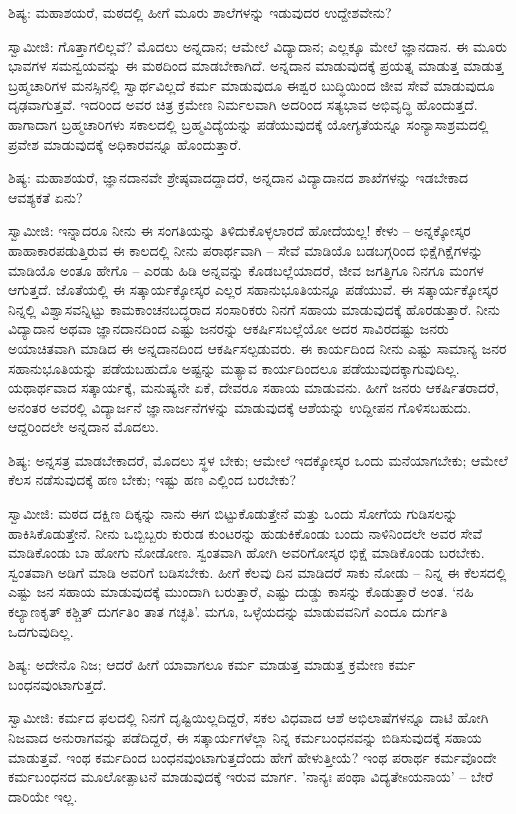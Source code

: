 ಶಿಷ್ಯ: ಮಹಾಶಯರೆ, ಮಠದಲ್ಲಿ ಹೀಗೆ ಮೂರು ಶಾಲೆಗಳನ್ನು ಇಡುವುದರ ಉದ್ದೇಶವೇನು?

ಸ್ವಾಮೀಜಿ: ಗೊತ್ತಾಗಲಿಲ್ಲವೆ? ಮೊದಲು ಅನ್ನದಾನ; ಆಮೇಲೆ ವಿದ್ಯಾದಾನ; ಎಲ್ಲಕ್ಕೂ ಮೇಲೆ ಜ್ಞಾನದಾನ. ಈ ಮೂರು ಭಾವಗಳ ಸಮನ್ವಯವನ್ನು ಈ ಮಠದಿಂದ ಮಾಡಬೇಕಾಗಿದೆ. ಅನ್ನದಾನ ಮಾಡುವುದಕ್ಕೆ ಪ್ರಯತ್ನ ಮಾಡುತ್ತ ಮಾಡುತ್ತ ಬ್ರಹ್ಮಚಾರಿಗಳ ಮನಸ್ಸಿನಲ್ಲಿ ಸ್ವಾರ್ಥವಿಲ್ಲದೆ ಕರ್ಮ ಮಾಡುವುದೂ ಈಶ್ವರ ಬುದ್ಧಿಯಿಂದ ಜೀವ ಸೇವೆ ಮಾಡುವುದೂ ದೃಢವಾಗುತ್ತವೆ. ಇದರಿಂದ ಅವರ ಚಿತ್ರ ಕ್ರಮೇಣ ನಿರ್ಮಲವಾಗಿ ಅದರಿಂದ ಸತ್ಯಭಾವ ಅಭಿವೃದ್ಧಿ ಹೊಂದುತ್ತದೆ. ಹಾಗಾದಾಗ ಬ್ರಹ್ಮಚಾರಿಗಳು ಸಕಾಲದಲ್ಲಿ ಬ್ರಹ್ಮವಿದ್ಯೆಯನ್ನು ಪಡೆಯುವುದಕ್ಕೆ ಯೋಗ್ಯತೆಯನ್ನೂ ಸಂನ್ಯಾಸಾಶ್ರಮದಲ್ಲಿ ಪ್ರವೇಶ ಮಾಡುವುದಕ್ಕೆ ಅಧಿಕಾರವನ್ನೂ ಹೊಂದುತ್ತಾರೆ.

ಶಿಷ್ಯ: ಮಹಾಶಯರೆ, ಜ್ಞಾನದಾನವೇ ಶ್ರೇಷ್ಠವಾದದ್ದಾದರೆ, ಅನ್ನದಾನ ವಿದ್ಯಾದಾನದ ಶಾಖೆಗಳನ್ನು ಇಡಬೇಕಾದ ಆವಶ್ಯಕತೆ ಏನು?

ಸ್ವಾಮೀಜಿ: ಇನ್ನಾದರೂ ನೀನು ಈ ಸಂಗತಿಯನ್ನು ತಿಳಿದುಕೊಳ್ಳಲಾರದೆ ಹೋದೆಯಲ್ಲ! ಕೇಳು – ಅನ್ನಕ್ಕೋಸ್ಕರ ಹಾಹಾಕಾರಪಡುತ್ತಿರುವ ಈ ಕಾಲದಲ್ಲಿ ನೀನು ಪರಾರ್ಥವಾಗಿ – ಸೇವೆ ಮಾಡಿಯೊ ಬಡಬಗ್ಗರಿಂದ ಭಿಕ್ಷೆಗಿಕ್ಷೆಗಳನ್ನು ಮಾಡಿಯೊ ಅಂತೂ ಹೇಗೊ – ಎರಡು ಹಿಡಿ ಅನ್ನವನ್ನು ಕೊಡಬಲ್ಲೆಯಾದರೆ, ಜೀವ ಜಗತ್ತಿಗೂ ನಿನಗೂ ಮಂಗಳ ಆಗುತ್ತದೆ. ಜೊತೆಯಲ್ಲಿ ಈ ಸತ್ಕಾರ್ಯಕ್ಕೋಸ್ಕರ ಎಲ್ಲರ ಸಹಾನುಭೂತಿಯನ್ನೂ ಪಡೆಯುವೆ. ಈ ಸತ್ಕಾರ್ಯಕ್ಕೋಸ್ಕರ ನಿನ್ನಲ್ಲಿ ವಿಶ್ವಾಸವನ್ನಿಟ್ಟು ಕಾಮಕಾಂಚನಬದ್ಧರಾದ ಸಂಸಾರಿಕರು ನಿನಗೆ ಸಹಾಯ ಮಾಡುವುದಕ್ಕೆ ಹೊರಡುತ್ತಾರೆ. ನೀನು ವಿದ್ಯಾದಾನ ಅಥವಾ ಜ್ಞಾನದಾನದಿಂದ ಎಷ್ಟು ಜನರನ್ನು ಆಕರ್ಷಿಸಬಲ್ಲೆಯೋ ಅದರ ಸಾವಿರದಷ್ಟು ಜನರು ಅಯಾಚಿತವಾಗಿ ಮಾಡಿದ ಈ ಅನ್ನದಾನದಿಂದ ಆಕರ್ಷಿಸಲ್ಪಡುವರು. ಈ ಕಾರ್ಯದಿಂದ ನೀನು ಎಷ್ಟು ಸಾಮಾನ್ಯ ಜನರ ಸಹಾನುಭೂತಿಯನ್ನು ಪಡೆಯಬಹುದೊ ಅಷ್ಟನ್ನು ಮತ್ಯಾವ ಕಾರ್ಯದಿಂದಲೂ ಪಡೆಯುವುದಕ್ಕಾಗುವುದಿಲ್ಲ. ಯಥಾರ್ಥವಾದ ಸತ್ಕಾರ್ಯಕ್ಕೆ, ಮನುಷ್ಯನೇ ಏಕೆ, ದೇವರೂ ಸಹಾಯ ಮಾಡುವನು. ಹೀಗೆ ಜನರು ಆಕರ್ಷಿತರಾದರೆ, ಅನಂತರ ಅವರಲ್ಲಿ ವಿದ್ಯಾರ್ಜನೆ ಜ್ಞಾನಾರ್ಜನೆಗಳನ್ನು ಮಾಡುವುದಕ್ಕೆ ಆಶೆಯನ್ನು ಉದ್ದೀಪನ ಗೊಳಿಸಬಹುದು. ಆದ್ದರಿಂದಲೇ ಅನ್ನದಾನ ಮೊದಲು.

ಶಿಷ್ಯ: ಅನ್ನಸತ್ರ ಮಾಡಬೇಕಾದರೆ, ಮೊದಲು ಸ್ಥಳ ಬೇಕು; ಆಮೇಲೆ ಇದಕ್ಕೋಸ್ಕರ ಒಂದು ಮನೆಯಾಗಬೇಕು; ಆಮೇಲೆ ಕೆಲಸ ನಡೆಸುವುದಕ್ಕೆ ಹಣ ಬೇಕು; ಇಷ್ಟು ಹಣ ಎಲ್ಲಿಂದ ಬರಬೇಕು?

ಸ್ವಾಮೀಜಿ: ಮಠದ ದಕ್ಷಿಣ ದಿಕ್ಕನ್ನು ನಾನು ಈಗ ಬಿಟ್ಟುಕೊಡುತ್ತೇನೆ ಮತ್ತು ಒಂದು ಸೋಗೆಯ ಗುಡಿಸಲನ್ನು ಹಾಕಿಸಿಕೊಡುತ್ತೇನೆ. ನೀನು ಒಬ್ಬಿಬ್ಬರು ಕುರುಡ ಕುಂಟರನ್ನು ಹುಡುಕಿಕೊಂಡು ಬಂದು ನಾಳಿನಿಂದಲೇ ಅವರ ಸೇವೆ ಮಾಡಿಕೊಂಡು ಬಾ ಹೋಗು ನೋಡೋಣ. ಸ್ವಂತವಾಗಿ ಹೋಗಿ ಅವರಿಗೋಸ್ಕರ ಭಿಕ್ಷೆ ಮಾಡಿಕೊಂಡು ಬರಬೇಕು. ಸ್ವಂತವಾಗಿ ಅಡಿಗೆ ಮಾಡಿ ಅವರಿಗೆ ಬಡಿಸಬೇಕು. ಹೀಗೆ ಕೆಲವು ದಿನ ಮಾಡಿದರೆ ಸಾಕು ನೋಡು – ನಿನ್ನ ಈ ಕೆಲಸದಲ್ಲಿ ಎಷ್ಟು ಜನ ಸಹಾಯ ಮಾಡುವುದಕ್ಕೆ ಮುಂದಾಗಿ ಬರುತ್ತಾರೆ, ಎಷ್ಟು ದುಡ್ಡು ಕಾಸನ್ನು ಕೊಡುತ್ತಾರೆ ಅಂತ. ‘ನಹಿ ಕಲ್ಯಾಣಕೃತ್ ಕಶ್ಚಿತ್ ದುರ್ಗತಿಂ ತಾತ ಗಚ್ಛತಿ’. ಮಗೂ, ಒಳ್ಳೆಯದನ್ನು ಮಾಡುವವನಿಗೆ ಎಂದೂ ದುರ್ಗತಿ ಒದಗುವುದಿಲ್ಲ.

ಶಿಷ್ಯ: ಅದೇನೊ ನಿಜ; ಆದರೆ ಹೀಗೆ ಯಾವಾಗಲೂ ಕರ್ಮ ಮಾಡುತ್ತ ಮಾಡುತ್ತ ಕ್ರಮೇಣ ಕರ್ಮ ಬಂಧನವುಂಟಾಗುತ್ತದೆ.

ಸ್ವಾಮೀಜಿ: ಕರ್ಮದ ಫಲದಲ್ಲಿ ನಿನಗೆ ದೃಷ್ಟಿಯಿಲ್ಲದಿದ್ದರೆ, ಸಕಲ ವಿಧವಾದ ಆಶೆ ಅಭಿಲಾಷೆಗಳನ್ನೂ ದಾಟಿ ಹೋಗಿ ನಿಜವಾದ ಅನುರಾಗವನ್ನು ಪಡೆದಿದ್ದರೆ, ಈ ಸತ್ಕಾರ್ಯಗಳೆಲ್ಲಾ ನಿನ್ನ ಕರ್ಮಬಂಧನವನ್ನು ಬಿಡಿಸುವುದಕ್ಕೆ ಸಹಾಯ ಮಾಡುತ್ತವೆ. ಇಂಥ ಕರ್ಮದಿಂದ ಬಂಧನವುಂಟಾಗುತ್ತದೆಂದು ಹೇಗೆ ಹೇಳುತ್ತೀಯೆ? ಇಂಥ ಪರಾರ್ಥ ಕರ್ಮವೊಂದೇ ಕರ್ಮಬಂಧನದ ಮೂಲೋತ್ಪಾಟನೆ ಮಾಡುವುದಕ್ಕೆ ಇರುವ ಮಾರ್ಗ. 'ನಾನ್ಯಃ ಪಂಥಾ ವಿದ್ಯತೇsಯನಾಯ' – ಬೇರೆ ದಾರಿಯೇ ಇಲ್ಲ.

